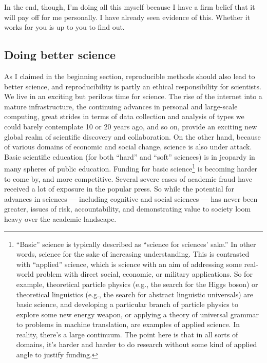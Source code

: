 \documentclass{book}
\begin{document}
In the end, though, I'm doing all this myself because I have a firm belief that it will pay off for me personally.  I have already seen evidence of this. Whether it works for you is up to you to find out.
\subsection{Doing better science}
\label{sec-2-3-2}

As I claimed in the beginning section, reproducible methods should also lead to better science, and reproducibility is partly an ethical responsibility for scientists. We live in an exciting but perilous time for science. The rise of the internet into a mature infrastructure, the continuing advances in personal and large-scale computing, great strides in terms of data collection and analysis of types we could barely contemplate 10 or 20 years ago, and so on, provide an exciting new global realm of scientific discovery and collaboration. On the other hand, because of various domains of economic and social change, science is also under attack.  Basic scientific education (for both ``hard'' and ``soft'' sciences) is in jeopardy in many spheres of public education.  Funding for basic science\footnote{``Basic'' science is typically described as ``science for sciences' sake.'' In other words, science for the sake of increasing understanding. This is contrasted with ``applied'' science, which is science with an aim of addressing some real-world problem with direct social, economic, or military applications. So for example, theoretical particle physics (e.g., the search for the Higgs boson) or theoretical linguistics (e.g., the search for abstract linguistic universals) are basic science, and developing a particular branch of particle physics to explore some new energy weapon, or applying a theory of universal grammar to problems in machine translation, are examples of applied science. In reality, there's a large continuum. The point here is that in all sorts of domains, it's harder and harder to do research without some kind of applied angle to justify funding.
 } is becoming harder to come by, and more competitive.  Several severe cases of academic fraud have received a lot of exposure in the popular press. So while the potential for advances in sciences --- including cognitive and social sciences --- has never been greater, issues of risk, accountability, and demonstrating value to society loom heavy over the academic landscape.
\end{document}
